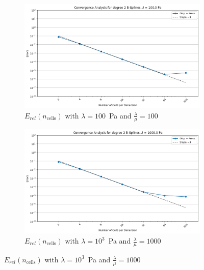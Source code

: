 \documentclass[a4paper,12pt,twoside]{report}
\begin{document}
\begin{figure}[!h]
\begin{subfigure}[b]{0.49\textwidth}
		\includegraphics[width=\textwidth]{figures/figures_mixed_DH/sum_convergence_plot_degree_2_lambda=100.0.png}
		\caption{$E_{rel}(n_{\text{cells}})$ with $\lambda = 100$~Pa and $\frac{\lambda}{\mu} = 100$}
		\label{fig:convergencedegree2mixeddirichlethomogeneouslambda100}
	\end{subfigure}
	\begin{subfigure}[b]{0.49\textwidth}
		\centering
		\includegraphics[width=\textwidth]{figures/figures_mixed_DH/sum_convergence_plot_degree_2_lambda=1000.0.png}
		\caption{$E_{rel}(n_{\text{cells}})$ with $\lambda = 10^3$~Pa and $\frac{\lambda}{\mu} = 1000$}
		\label{fig:convergencedegree2mixeddirichlethomogeneouslambda1000}
	\end{subfigure}
\end{figure}
\end{document}
